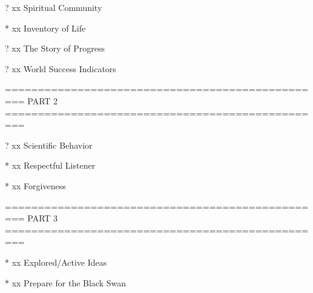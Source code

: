 ?	xx  Spiritual Community   %

*	xx  Inventory of Life   %

?	xx  The Story of Progress   %

?	xx  World Success Indicators   %

=================================================
 PART 2
=================================================

?	xx  Scientific Behavior   %

*	xx  Respectful Listener   %

*	xx  Forgiveness   %


=================================================
 PART 3
=================================================

*	xx  Explored/Active Ideas   %

*	xx  Prepare for the Black Swan   %


